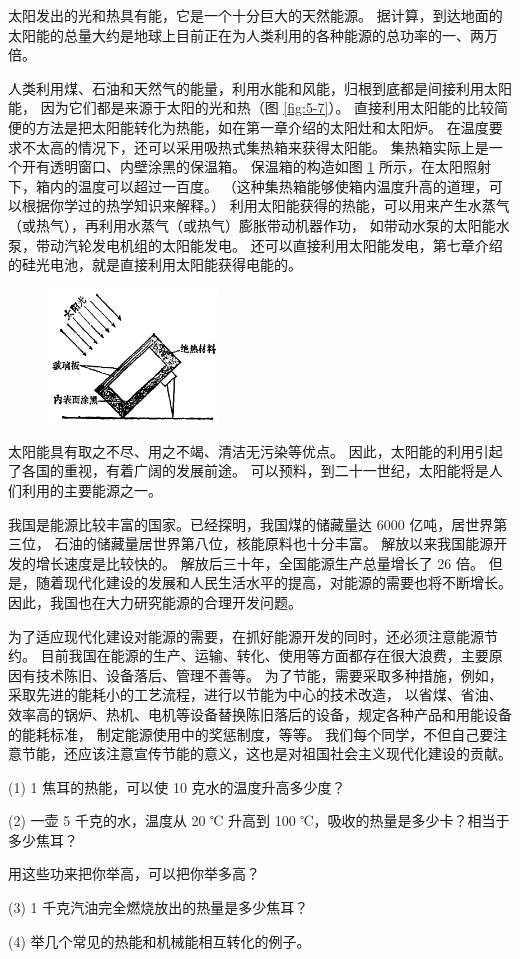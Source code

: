 太阳发出的光和热具有能，它是一个十分巨大的天然能源。
据计算，到达地面的太阳能的总量大约是地球上目前正在为人类利用的各种能源的总功率的一、两万倍。

人类利用煤、石油和天然气的能量，利用水能和风能，归根到底都是间接利用太阳能，
因为它们都是来源于太阳的光和热（图 \ref{fig:5-7}）。
直接利用太阳能的比较简便的方法是把太阳能转化为热能，如在第一章介绍的太阳灶和太阳炉。
在温度要求不太高的情况下，还可以采用吸热式集热箱来获得太阳能。
集热箱实际上是一个开有透明窗口、内壁涂黑的保温箱。
保温箱的构造如图 \ref{fig:5-8} 所示，在太阳照射下，箱内的温度可以超过一百度。
（这种集热箱能够使箱内温度升高的道理，可以根据你学过的热学知识来解释。）
利用太阳能获得的热能，可以用来产生水蒸气（或热气），再利用水蒸气（或热气）膨胀带动机器作功，
如带动水泵的太阳能水泵，带动汽轮发电机组的太阳能发电。
还可以直接利用太阳能发电，第七章介绍的硅光电池，就是直接利用太阳能获得电能的。

\begin{figure}[htbp]
    \centering
    \includegraphics[width=0.4\textwidth]{../pic/czwl2-ch5-8}
    \caption{}\label{fig:5-8}
\end{figure}

太阳能具有取之不尽、用之不竭、清洁无污染等优点。
因此，太阳能的利用引起了各国的重视，有着广阔的发展前途。
可以预料，到二十一世纪，太阳能将是人们利用的主要能源之一。

我国是能源比较丰富的国家。已经探明，我国煤的储藏量达 6000 亿吨，居世界第三位，
石油的储藏量居世界第八位，核能原料也十分丰富。
解放以来我国能源开发的增长速度是比较快的。
解放后三十年，全国能源生产总量增长了 26 倍。
但是，随着现代化建设的发展和人民生活水平的提高，对能源的需要也将不断增长。
因此，我国也在大力研究能源的合理开发问题。

为了适应现代化建设对能源的需要，在抓好能源开发的同时，还必须注意能源节约。
目前我国在能源的生产、运输、转化、使用等方面都存在很大浪费，主要原因有技术陈旧、设备落后、管理不善等。
为了节能，需要采取多种措施，例如，采取先进的能耗小的工艺流程，进行以节能为中心的技术改造，
以省煤、省油、效率高的锅炉、热机、电机等设备替换陈旧落后的设备，规定各种产品和用能设备的能耗标准，
制定能源使用中的奖惩制度，等等。
我们每个同学，不但自己要注意节能，还应该注意宣传节能的意义，这也是对祖国社会主义现代化建设的贡献。


\lianxi

(1) 1 焦耳的热能，可以使 10 克水的温度升高多少度？

(2) 一壶 5 千克的水，温度从 20 ℃ 升高到 100 ℃，吸收的热量是多少卡？相当于多少焦耳？

用这些功来把你举高，可以把你举多高？

(3) 1 千克汽油完全燃烧放出的热量是多少焦耳？

(4) 举几个常见的热能和机械能相互转化的例子。

